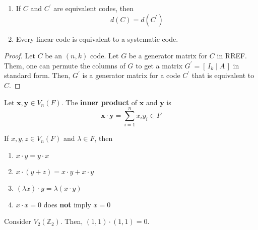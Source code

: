 \begin{thmbox}
    \begin{theorem}
        \begin{enumerate}[(1)]
            \item If $ C $ and $ C^{\prime} $ are equivalent codes, then
                  \[ d(C)=d(C^{\prime}) \]
            \item Every linear code is equivalent to a systematic code.
        \end{enumerate}
    \end{theorem} \end{thmbox}

\begin{proof}
    Let $ C $ be an $ (n,k) $ code. Let $ G $ be a generator matrix for $ C $
    in RREF. Them, one can permute the columns of $ G $ to get a matrix
    $ G^{\prime}=\left[ \,I_k\mid A\, \right] $ in standard form. Then,
    $ G^{\prime} $ is a generator matrix for a code $ C^{\prime} $ that is
    equivalent to $ C $.
\end{proof}

\begin{defbox}
    \begin{definition}
        Let $ \bm{x},\bm{y}\in V_n(F) $. The \textbf{inner product}
        of $ \bm{x} $ and $ \bm{y} $ is 
        \[ \bm{x}\cdot \bm{y}=\sum\limits_{i=1}^{n} x_iy_i\in F \]
    \end{definition} \end{defbox}

\begin{thmbox}
    \begin{theorem}
        If $ x,y,z\in V_n(F) $ and $ \lambda\in F $, then
        \begin{enumerate}[(1)]
            \item $ x\cdot y=y\cdot x $
            \item $ x\cdot (y+z)=x\cdot y+x\cdot y $
            \item $ (\lambda x)\cdot y=\lambda(x\cdot y) $
            \item $ x\cdot x=0$ does \textbf{not} imply $ x=0 $
        \end{enumerate}
    \end{theorem} \end{thmbox}

\begin{exbox}
    \begin{example}
    Consider $ V_2(\mathbb{Z}_2) $. Then, $ (1,1)\cdot(1,1)=0 $.
\end{example}
\end{exbox}

